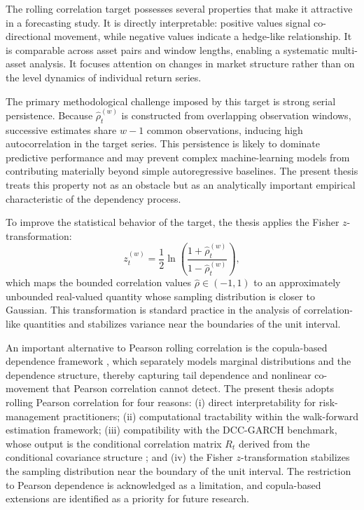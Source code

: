 The rolling correlation target possesses several properties that make it attractive in a forecasting study. It is directly interpretable: positive values signal co-directional movement, while negative values indicate a hedge-like relationship. It is comparable across asset pairs and window lengths, enabling a systematic multi-asset analysis. It focuses attention on changes in market structure rather than on the level dynamics of individual return series.

The primary methodological challenge imposed by this target is strong serial persistence. Because $\hat{\rho}_{t}^{(w)}$ is constructed from overlapping observation windows, successive estimates share $w-1$ common observations, inducing high autocorrelation in the target series. This persistence is likely to dominate predictive performance and may prevent complex machine-learning models from contributing materially beyond simple autoregressive baselines. The present thesis treats this property not as an obstacle but as an analytically important empirical characteristic of the dependency process.

To improve the statistical behavior of the target, the thesis applies the Fisher $z$-transformation:
\begin{equation}
    z_{t}^{(w)} = \frac{1}{2}\ln\!\left(\frac{1 + \hat{\rho}_{t}^{(w)}}{1 - \hat{\rho}_{t}^{(w)}}\right),
\end{equation}
which maps the bounded correlation values $\hat{\rho} \in (-1,1)$ to an approximately unbounded real-valued quantity whose sampling distribution is closer to Gaussian. This transformation is standard practice in the analysis of correlation-like quantities and stabilizes variance near the boundaries of the unit interval.

An important alternative to Pearson rolling correlation is the copula-based dependence framework \citep{patton2006copula}, which separately models marginal distributions and the dependence structure, thereby capturing tail dependence and nonlinear co-movement that Pearson correlation cannot detect. The present thesis adopts rolling Pearson correlation for four reasons: (i) direct interpretability for risk-management practitioners; (ii) computational tractability within the walk-forward estimation framework; (iii) compatibility with the DCC-GARCH benchmark, whose output is the conditional correlation matrix $R_t$ derived from the conditional covariance structure \citep{engle2001theoretical}; and (iv) the Fisher $z$-transformation stabilizes the sampling distribution near the boundary of the unit interval. The restriction to Pearson dependence is acknowledged as a limitation, and copula-based extensions are identified as a priority for future research.

